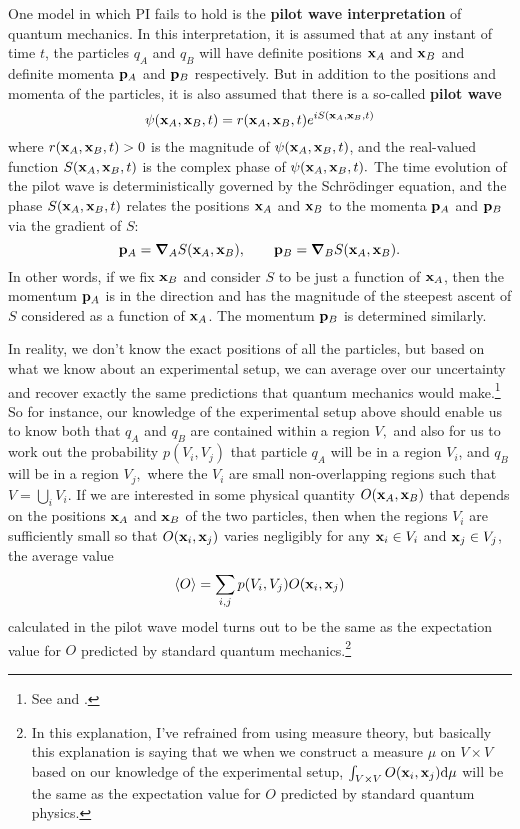 One model in which PI fails to hold is the \textbf{pilot wave interpretation} of quantum mechanics. In this interpretation, it is assumed that at any instant of time $t$, the particles $q_A$ and $q_B$ will have definite positions $\vb{x}_A$ and $\vb{x}_B$ and definite momenta $\vb{p}_A$ and $\vb{p}_B$ respectively. But in addition to the positions and momenta of the particles, it is also assumed that there is a so-called \textbf{pilot wave} 
\begin{equation}
\psi(\vb{x}_A, \vb{x}_B, t)=r(\vb{x}_A, \vb{x}_B, t)e^{i S(\vb{x}_A, \vb{x}_B, t)} 
\end{equation}
where $r(\vb{x}_A, \vb{x}_B, t)>0$ is the magnitude of $\psi(\vb{x}_A, \vb{x}_B, t)$, and the real-valued function $S(\vb{x}_A, \vb{x}_B,t )$ is the complex phase of $\psi(\vb{x}_A, \vb{x}_B, t).$
The time evolution of the pilot wave is deterministically governed by the Schr\"{o}dinger equation, and the phase $S(\vb{x}_A, \vb{x}_B, t )$ relates the positions $\vb{x}_A$ and $\vb{x}_B$ to the momenta $\vb{p}_A$ and $\vb{p}_B$ via the gradient of $S$:
\begin{equation}
\vb{p}_A=\grad_A{S}(\vb{x}_A, \vb{x}_B),\qquad
\vb{p}_B=\grad_B{S}(\vb{x}_A, \vb{x}_B).
\end{equation}
In other words, if we fix $\vb{x}_B$ and consider $S$ to be just a function of $\vb{x}_A$, then the momentum $\vb{p}_A$ is in the direction and has the magnitude of the steepest ascent of $S$ considered as a function of $\vb{x}_A$. The momentum $\vb{p}_B$ is determined similarly. 

In reality, we don't know the exact positions of all the particles, but based on what we know about an experimental setup, we can average over our uncertainty and recover exactly the same predictions that quantum mechanics would make.\footnote{See \cite{BohmDavid1952A} and \cite{BohmDavid1952B}.} So for instance, our knowledge of the experimental setup above should enable us  to know both that $q_A$ and $q_B$ are contained within a region $V,$ and also for us to work out the probability  $p(V_i, V_j)$ that particle $q_A$  will be in a region $V_i$, and $q_B$ will be in a region $V_j,$ where the $V_i$ are small non-overlapping regions such that $V=\bigcup_iV_i$. If we are interested in some physical quantity $O(\vb{x}_A, \vb{x}_B)$ that depends on the positions $\vb{x}_A$ and $\vb{x}_B$ of the two particles, then when the regions $V_i$ are  sufficiently small so that $O(\vb{x}_i, \vb{x}_j)$ varies negligibly for any $\vb{x}_i\in V_i$ and $\vb{x}_j\in V_j$,  the average value
\begin{equation}\label{bohmconsistency}
\ev{O}=\sum_{i,j}p(V_i, V_j)O(\vb{x}_i, \vb{x}_j)
\end{equation}
calculated in the pilot wave model turns out to be the same as the expectation value for $O$ predicted by standard quantum mechanics.\footnote{In this explanation, I've refrained from using measure theory, but basically this explanation is saying that we when we construct a measure $\mu$ on $V\times V$ based on our knowledge of the experimental setup,  $\int_{V\times V}O(\vb{x}_i, \vb{x}_j)\dd\mu$ will be the same as the expectation value for $O$ predicted by standard quantum physics. }

